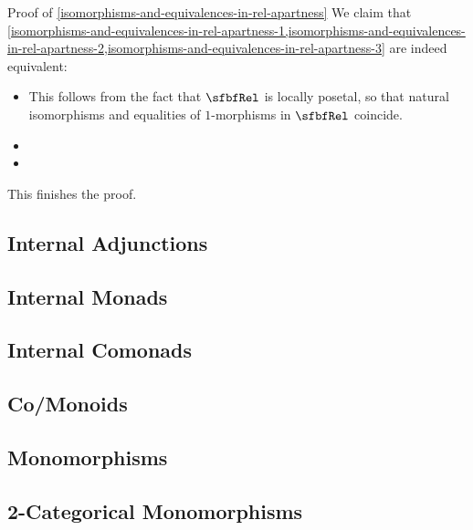 \begin{Proof}{Proof of \cref{isomorphisms-and-equivalences-in-rel-apartness}}%
    We claim that \cref{isomorphisms-and-equivalences-in-rel-apartness-1,isomorphisms-and-equivalences-in-rel-apartness-2,isomorphisms-and-equivalences-in-rel-apartness-3} are indeed equivalent:
    \begin{itemize}
        \item{}This follows from the fact that $\sfbfRel$ is locally posetal, so that natural isomorphisms and equalities of $1$-morphisms in $\sfbfRel$ coincide.
        \item{}
        \item{}
    \end{itemize}
    This finishes the proof.
\end{Proof}
\subsection{Internal Adjunctions}\label{subsection-internal-adjunctions-in-rel-apartness}
\subsection{Internal Monads}\label{subsection-internal-monads-in-rel-apartness}
\subsection{Internal Comonads}\label{subsection-internal-comonads-in-rel-apartness}
\subsection{Co/Monoids}\label{subsection-co-monoids-in-rel-apartness}
\subsection{Monomorphisms}\label{subsection-monomorphisms-in-rel-apartness}
\subsection{2-Categorical Monomorphisms}\label{subsection-2-categorical-monomorphisms-in-rel-apartness}
